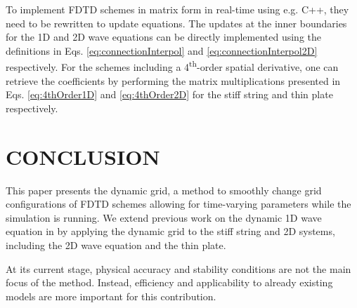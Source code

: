\documentclass[fleqn]{jaes}
\def\SWcomment[#1]{\textcolor{blue}{#1}}
\begin{document}



To implement FDTD schemes in matrix form in real-time using e.g. C++, they need to be rewritten to update equations. The updates at the inner boundaries for the 1D and 2D wave equations can be directly implemented using the definitions in Eqs. \eqref{eq:connectionInterpol} and \eqref{eq:connectionInterpol2D} respectively. For the schemes including a 4\textsuperscript{th}-order spatial derivative, one can retrieve the coefficients by performing the matrix multiplications presented in Eqs. \eqref{eq:4thOrder1D} and \eqref{eq:4thOrder2D} for the stiff string and thin plate respectively. 





\section{CONCLUSION}\label{sec:conclusion}
This paper presents the dynamic grid, a method to smoothly change grid configurations of FDTD schemes allowing for time-varying parameters while the simulation is running. We extend previous work on the dynamic 1D wave equation in \cite{Willemsen2021a} by applying the dynamic grid to the stiff string and 2D systems, including the 2D wave equation and the thin plate. 

At its current stage, physical accuracy and stability conditions are not the main focus of the method. Instead, efficiency and applicability to already existing models are more important for this contribution.
\end{document}
